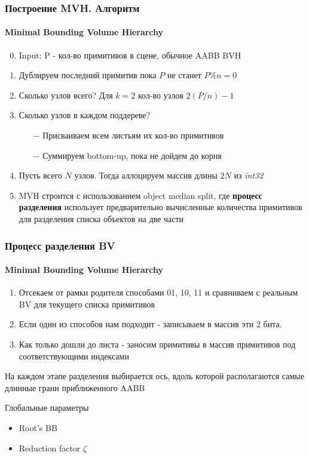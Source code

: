\begin{frame}
    \frametitle{Построение MVH. Алгоритм}
    \framesubtitle{Minimal Bounding Volume Hierarchy}
    \begin{enumerate}
        \setcounter{enumi}{-1}
        \item
            Input: P - кол-во примитивов в сцене, обычное AABB BVH
        \item
            Дублируем последний примитив пока $P$ не станет $ P \% n = 0$
        \item
            Сколько узлов всего? Для $k = 2$ кол-во узлов $2(P/n) -1$
        \item
            Сколько узлов в каждом поддереве?
            \begin{itemize}
                \item[$-$]
                    Присваиваем всем листьям их кол-во примитивов
                \item[$-$]
                    Суммируем bottom-up, пока не дойдем до корня
            \end{itemize}
        \item
            Пусть всего $N$ узлов. Тогда аллоцируем массив длины $2N$ из \textit{int32}
        \item
            MVH строится с использованием object median split, где
            \textbf{процесс разделения} использует предварительно вычисленные количества примитивов для
            разделения списка объектов на две части
    \end{enumerate}
\end{frame}

\begin{frame}
    \frametitle{Процесс разделения BV}
    \framesubtitle{Minimal Bounding Volume Hierarchy}
    \begin{enumerate}
        \item
            Отсекаем от рамки родителя способами 01, 10, 11 и сравниваем с реальным BV для текущего списка примитивов
        \item
            Если один из способов нам подходит - записываем в массив эти 2 бита.
        \item
            Как только дошли до листа - заносим примитивы в массив примитивов под соответствующими индексами
    \end{enumerate}
    \begin{block}{}
        На каждом этапе разделения выбирается ось, вдоль которой располагаются самые длинные грани приближенного AABB
    \end{block}
    \begin{block}{Глобальные параметры}
        \begin{itemize}
            \item
                Root's BB
            \item
                Reduction factor $\zeta$
        \end{itemize}
    \end{block}
\end{frame}


